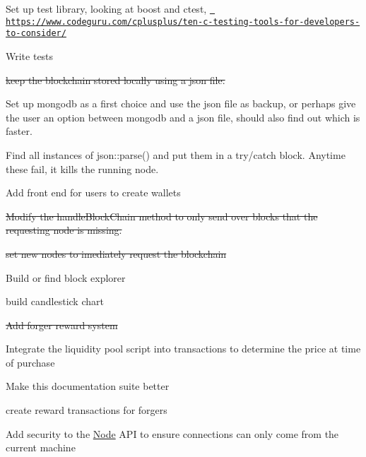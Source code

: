 
\begin{DoxyItemize}
\item Set up test library, looking at boost and ctest, \href{https://www.codeguru.com/cplusplus/ten-c-testing-tools-for-developers-to-consider/}{\texttt{ https\+://www.\+codeguru.\+com/cplusplus/ten-\/c-\/testing-\/tools-\/for-\/developers-\/to-\/consider/}}
\item Write tests
\item \sout{keep the blockchain stored locally using a json file.}
\item Set up mongodb as a first choice and use the json file as backup, or perhaps give the user an option between mongodb and a json file, should also find out which is faster.
\item Find all instances of json\+::parse() and put them in a try/catch block. Anytime these fail, it kills the running node.
\item Add front end for users to create wallets
\item \sout{Modify the handle\+Block\+Chain method to only send over blocks that the requesting node is missing.}
\item \sout{set new nodes to imediately request the blockchain}
\item Build or find block explorer
\item build candlestick chart
\item \sout{Add forger reward system}
\item Integrate the liquidity pool script into transactions to determine the price at time of purchase
\item Make this documentation suite better
\item create reward transactions for forgers
\item Add security to the \mbox{\hyperlink{class_node}{Node}} API to ensure connections can only come from the current machine 
\end{DoxyItemize}